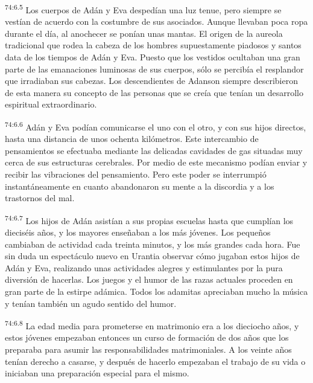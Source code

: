 \par
\textsuperscript{74:6.5} Los cuerpos de Adán y Eva despedían una luz tenue, pero siempre se vestían de acuerdo con la costumbre de sus asociados. Aunque llevaban poca ropa durante el día, al anochecer se ponían unas mantas. El origen de la aureola tradicional que rodea la cabeza de los hombres supuestamente piadosos y santos data de los tiempos de Adán y Eva. Puesto que los vestidos ocultaban una gran parte de las emanaciones luminosas de sus cuerpos, sólo se percibía el resplandor que irradiaban sus cabezas. Los descendientes de Adanson siempre describieron de esta manera su concepto de las personas que se creía que tenían un desarrollo espiritual extraordinario.

\par
\textsuperscript{74:6.6} Adán y Eva podían comunicarse el uno con el otro, y con sus hijos directos, hasta una distancia de unos ochenta kilómetros. Este intercambio de pensamientos se efectuaba mediante las delicadas cavidades de gas situadas muy cerca de sus estructuras cerebrales. Por medio de este mecanismo podían enviar y recibir las vibraciones del pensamiento. Pero este poder se interrumpió instantáneamente en cuanto abandonaron su mente a la discordia y a los trastornos del mal.

\par
\textsuperscript{74:6.7} Los hijos de Adán asistían a sus propias escuelas hasta que cumplían los dieciséis años, y los mayores enseñaban a los más jóvenes. Los pequeños cambiaban de actividad cada treinta minutos, y los más grandes cada hora. Fue sin duda un espectáculo nuevo en Urantia observar cómo jugaban estos hijos de Adán y Eva, realizando unas actividades alegres y estimulantes por la pura diversión de hacerlas. Los juegos y el humor de las razas actuales proceden en gran parte de la estirpe adámica. Todos los adamitas apreciaban mucho la música y tenían también un agudo sentido del humor.

\par
\textsuperscript{74:6.8} La edad media para prometerse en matrimonio era a los dieciocho años, y estos jóvenes empezaban entonces un curso de formación de dos años que los preparaba para asumir las responsabilidades matrimoniales. A los veinte años tenían derecho a casarse, y después de hacerlo empezaban el trabajo de su vida o iniciaban una preparación especial para el mismo.

